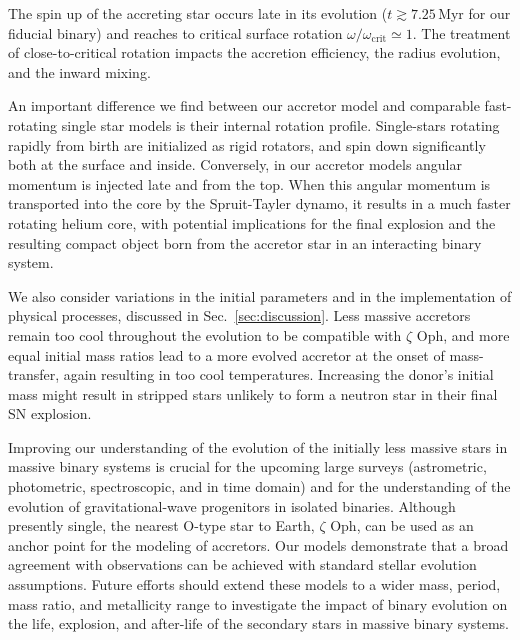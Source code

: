 \documentclass[twocolumn,twocolappendix,trackchanges]{aastex63}
\DeclareRobustCommand{\Secref}[1]{Sec.~\ref{#1}}
\newcommand{\zoph}{$\zeta$ Oph}
\begin{document}
The spin up of the accreting star occurs late in its evolution
($t\gtrsim7.25$\,Myr for our fiducial binary) and
reaches to critical surface rotation
$\omega/\omega_\mathrm{crit}\simeq 1$. %
The treatment of close-to-critical rotation
impacts the accretion efficiency, the radius evolution, and the inward
mixing.

An important difference we find between our accretor model and
comparable fast-rotating single star models is their internal rotation
profile. Single-stars rotating rapidly from birth are initialized as
rigid rotators, and spin down significantly both at the surface and
inside. Conversely, in our accretor models angular momentum is
injected late and from the top. When this angular momentum is
transported into the core by the Spruit-Tayler dynamo, it results in a
much faster rotating helium core, with potential implications for the
final explosion and the resulting compact object born from the
accretor star in an interacting binary system. %


We also consider variations in the initial parameters and in the
implementation of physical processes, discussed in
\Secref{sec:discussion}.  Less massive accretors remain too cool
throughout the evolution to be compatible with \zoph, and more equal
initial mass ratios lead to a more evolved accretor at the onset of
mass-transfer, again resulting in too cool temperatures. Increasing
the donor's initial mass might result in stripped stars unlikely to
form a neutron star in their final SN explosion.

Improving our understanding of the evolution of the initially less
massive stars in massive binary systems is crucial for the upcoming
large surveys (astrometric, photometric, spectroscopic, and in time domain) and for the understanding of the evolution of
gravitational-wave progenitors in isolated binaries. Although
presently single, the nearest O-type star to Earth, \zoph, can be used
as an anchor point for the modeling of accretors. Our models
demonstrate that a broad agreement with observations can be
achieved with standard stellar evolution assumptions. Future efforts
should extend these models to a wider mass, period, mass ratio, and metallicity
range to investigate the impact of binary evolution on the life,
explosion, and after-life of the secondary stars in massive binary
systems.
\end{document}
